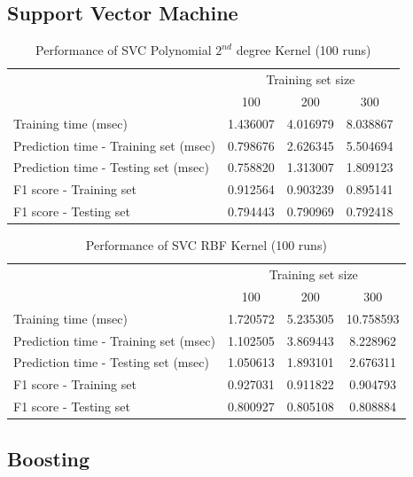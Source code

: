 \documentclass{article}
\begin{document}
	\subsection{Support Vector Machine}
	\begin{table}[h]
		\centering
		\begin{tabular}{l|ccc}
			\toprule
			{} & \multicolumn{3}{c}{Training set size} \\
			{} &       100 &       200 &       300 \\
			\midrule
			Training time (msec)                  &  1.436007 &  4.016979 &  8.038867 \\
			Prediction time - Training set (msec) &  0.798676 &  2.626345 &  5.504694 \\
			Prediction time - Testing set (msec)  &  0.758820 &  1.313007 &  1.809123 \\
			F1 score - Training set               &  0.912564 &  0.903239 &  0.895141 \\
			F1 score - Testing set                &  0.794443 &  0.790969 &  0.792418 \\
			\bottomrule
		\end{tabular}
		\caption{Performance of SVC Polynomial $2^{nd}$ degree Kernel (100 runs)}
		\label{tab:svc_poly_100}
	\end{table}
	
	\begin{table}[!ht]
		\centering
		\begin{tabular}{l|ccc}
			\toprule
			{} & \multicolumn{3}{c}{Training set size} \\
			{} &       100 &       200 &       300 \\
			\midrule
			Training time (msec)                  &  1.720572 &  5.235305 &  10.758593 \\
			Prediction time - Training set (msec) &  1.102505 &  3.869443 &   8.228962 \\
			Prediction time - Testing set (msec)  &  1.050613 &  1.893101 &   2.676311 \\
			F1 score - Training set               &  0.927031 &  0.911822 &   0.904793 \\
			F1 score - Testing set                &  0.800927 &  0.805108 &   0.808884 \\
			\bottomrule
		\end{tabular}
		\caption{Performance of SVC RBF Kernel (100 runs)}
		\label{tab:svc_rbf_100}
	\end{table}
	
	\subsection{Boosting}
	
\end{document}
